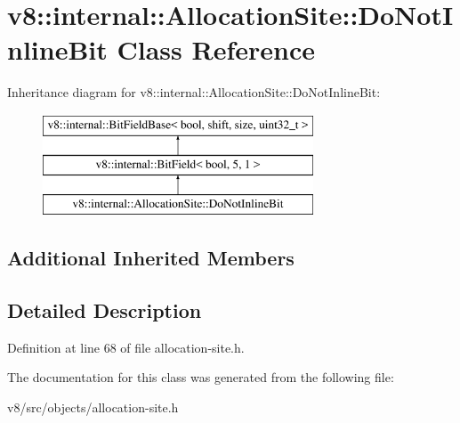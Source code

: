 \hypertarget{classv8_1_1internal_1_1AllocationSite_1_1DoNotInlineBit}{}\section{v8\+:\+:internal\+:\+:Allocation\+Site\+:\+:Do\+Not\+Inline\+Bit Class Reference}
\label{classv8_1_1internal_1_1AllocationSite_1_1DoNotInlineBit}
Inheritance diagram for v8\+:\+:internal\+:\+:Allocation\+Site\+:\+:Do\+Not\+Inline\+Bit\+:\begin{figure}[H]
\begin{center}
\leavevmode
\includegraphics[height=3.000000cm]{classv8_1_1internal_1_1AllocationSite_1_1DoNotInlineBit}
\end{center}
\end{figure}
\subsection*{Additional Inherited Members}


\subsection{Detailed Description}


Definition at line 68 of file allocation-\/site.\+h.



The documentation for this class was generated from the following file\+:\begin{DoxyCompactItemize}
\item 
v8/src/objects/allocation-\/site.\+h\end{DoxyCompactItemize}
